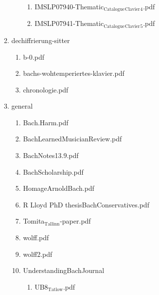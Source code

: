 \documentclass[11pt]{article}
\begin{document}
\begin{enumerate}
\begin{enumerate}
\begin{enumerate}
\begin{enumerate}
\item IMSLP07940-Thematic$_{\text{Catalogue}}$$_{\text{Clavier}}$$_{\text{4}}$.pdf
\label{sec-1-1-1-1-31-7-2-1-8-12}

\item IMSLP07941-Thematic$_{\text{Catalogue}}$$_{\text{Clavier}}$$_{\text{5}}$.pdf
\label{sec-1-1-1-1-31-7-2-1-8-13}
\end{enumerate}
\end{enumerate}

\item dechiffrierung-sitter
\label{sec-1-1-1-1-31-7-2-2}
\begin{enumerate}
\item b-0.pdf
\label{sec-1-1-1-1-31-7-2-2-1}

\item bachs-wohtemperiertes-klavier.pdf
\label{sec-1-1-1-1-31-7-2-2-2}

\item chronologie.pdf
\label{sec-1-1-1-1-31-7-2-2-3}
\end{enumerate}

\item general
\label{sec-1-1-1-1-31-7-2-3}
\begin{enumerate}
\item Bach.Harm.pdf
\label{sec-1-1-1-1-31-7-2-3-1}

\item BachLearnedMusicianReview.pdf
\label{sec-1-1-1-1-31-7-2-3-2}

\item BachNotes13.9.pdf
\label{sec-1-1-1-1-31-7-2-3-3}

\item BachScholarship.pdf
\label{sec-1-1-1-1-31-7-2-3-4}

\item HomageArnoldBach.pdf
\label{sec-1-1-1-1-31-7-2-3-5}

\item R Lloyd PhD thesisBachConservatives.pdf
\label{sec-1-1-1-1-31-7-2-3-6}

\item Tomita$_{\text{Tallinn}}$-paper.pdf
\label{sec-1-1-1-1-31-7-2-3-7}

\item wolff.pdf
\label{sec-1-1-1-1-31-7-2-3-8}

\item wolff2.pdf
\label{sec-1-1-1-1-31-7-2-3-9}

\item UnderstandingBachJournal
\label{sec-1-1-1-1-31-7-2-3-10}
\begin{enumerate}
\item UB8$_{\text{Tatlow}}$.pdf
\label{sec-1-1-1-1-31-7-2-3-10-1}
\end{enumerate}
\end{enumerate}


\end{enumerate}
\end{enumerate}
\end{document}
